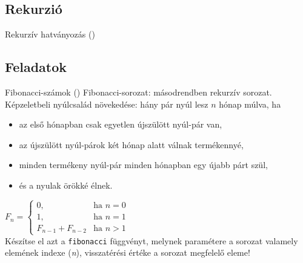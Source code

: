 \subsection{Rekurzió}

\begin{frame}
    \begin{exampleblock}{Rekurzív hatványozás ()}
        \small
        
    \end{exampleblock}
\end{frame}

\subsection{Feladatok}

\begin{frame}
    \begin{exampleblock}{Fibonacci-számok ()}
        Fibonacci-sorozat: másodrendben rekurzív sorozat. Képzeletbeli nyúlcsalád növekedése: hány pár nyúl lesz $n$ hónap múlva, ha
        \begin{itemize}
            \item az első hónapban csak egyetlen újszülött nyúl-pár van,
            \item az újszülött nyúl-párok két hónap alatt válnak termékennyé,
            \item minden termékeny nyúl-pár minden hónapban egy újabb párt szül,
            \item és a nyulak örökké élnek.
        \end{itemize}
        \vfill
        $F_n = \left\{ \begin{array}{ll}
            0, & \textrm{ha $n=0$}\\
            1, & \textrm{ha $n=1$}\\
            F_{n-1} + F_{n-2} & \textrm{ha $n>1$}
        \end{array} \right.$ \\
        Készítse el azt a \texttt{fibonacci} függvényt, melynek paramétere a sorozat valamely elemének indexe (\emph{n}), visszatérési értéke a sorozat megfelelő eleme!
    \end{exampleblock}
\end{frame}

